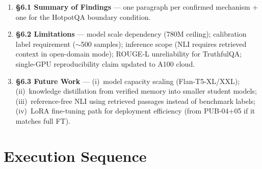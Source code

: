 \documentclass[12pt,a4paper]{article}
\begin{document}
\begin{enumerate}
  \item \textbf{\S6.1 Summary of Findings} --- one paragraph per confirmed
        mechanism + one for the HotpotQA boundary condition.
  \item \textbf{\S6.2 Limitations} --- model scale dependency (780M ceiling);
        calibration label requirement ($\sim$500 samples); inference scope
        (NLI requires retrieved context in open-domain mode);
        ROUGE-L unreliability for TruthfulQA; single-GPU reproducibility
        claim updated to A100 cloud.
  \item \textbf{\S6.3 Future Work} --- (i)~model capacity scaling
        (Flan-T5-XL/XXL); (ii)~knowledge distillation from verified memory
        into smaller student models; (iii)~reference-free NLI using retrieved
        passages instead of benchmark labels; (iv)~LoRA fine-tuning path
        for deployment efficiency (from PUB-04+05 if it matches full FT).
\end{enumerate}

\section{Execution Sequence}
\label{sec:execution}
\end{document}
